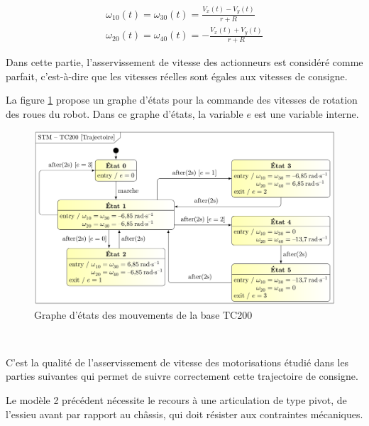 \begin{center}
\begin{eqnarray}
\omega_{10}(t)=\omega_{30}(t)=\frac{V_x(t)-V_y(t)}{r+R} \label{eq1} \\
\omega_{20}(t)=\omega_{40}(t)=-\frac{V_x(t)+V_y(t)}{r+R} \label{eq2}
\end{eqnarray}
\end{center}

Dans cette partie, l'asservissement de vitesse des actionneurs est considéré comme parfait, c'est-à-dire que les vitesses réelles sont égales aux vitesses de consigne.

La figure \ref{fig08} propose un graphe d'états pour la commande des vitesses de rotation des roues du robot. Dans ce graphe d'états, la variable $e$ est une variable interne.

\newpage

\begin{figure}[!ht]
\begin{center}
 \includegraphics[width=0.9\linewidth]{img/fig08.png}
  \caption{Graphe d'états des mouvements de la base TC200}
\label{fig08}
 \end{center}
\end{figure}

\vspace{-1cm}


~\

C'est la qualité de l'asservissement de vitesse des motorisations étudié dans les parties suivantes qui permet de suivre correctement cette trajectoire de consigne.

Le modèle 2 précédent nécessite le recours à une articulation de type pivot, de l'essieu avant par rapport au châssis, qui doit résister aux contraintes mécaniques.

